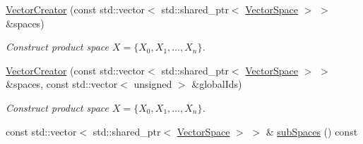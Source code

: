 \begin{DoxyCompactItemize}
\item 
\hyperlink{classSpacy_1_1ProductSpace_1_1VectorCreator_a73b6243d0ba00d019319e66bb06784dd}{Vector\+Creator} (const std\+::vector$<$ std\+::shared\+\_\+ptr$<$ \hyperlink{classSpacy_1_1VectorSpace}{Vector\+Space} $>$ $>$ \&spaces)
\begin{DoxyCompactList}\small\item\em Construct product space $ X = \{ X_0 , X_1 , \ldots , X_n \} $. \end{DoxyCompactList}\item 
\hyperlink{classSpacy_1_1ProductSpace_1_1VectorCreator_a63b039f3e2872a0488223121ed5eceb9}{Vector\+Creator} (const std\+::vector$<$ std\+::shared\+\_\+ptr$<$ \hyperlink{classSpacy_1_1VectorSpace}{Vector\+Space} $>$ $>$ \&spaces, const std\+::vector$<$ unsigned $>$ \&global\+Ids)
\begin{DoxyCompactList}\small\item\em Construct product space $ X = \{ X_0 , X_1 , \ldots , X_n \} $. \end{DoxyCompactList}\item 
\hypertarget{classSpacy_1_1ProductSpace_1_1VectorCreator_aa46303313c37f29cdfe54479d85cfe87}{}const std\+::vector$<$ std\+::shared\+\_\+ptr$<$ \hyperlink{classSpacy_1_1VectorSpace}{Vector\+Space} $>$ $>$ \& \hyperlink{classSpacy_1_1ProductSpace_1_1VectorCreator_aa46303313c37f29cdfe54479d85cfe87}{sub\+Spaces} () const \label{classSpacy_1_1ProductSpace_1_1VectorCreator_aa46303313c37f29cdfe54479d85cfe87}


\end{DoxyCompactItemize}
